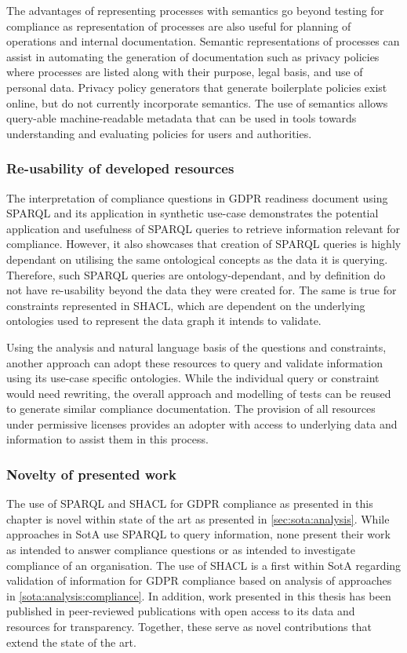 The advantages of representing processes with semantics go beyond testing for compliance as representation of processes are also useful for planning of operations and internal documentation. Semantic representations of processes can assist in automating the generation of documentation such as privacy policies where processes are listed along with their purpose, legal basis, and use of personal data. Privacy policy generators that generate boilerplate policies exist online, but do not currently incorporate semantics. The use of semantics allows query-able machine-readable metadata that can be used in tools towards understanding and evaluating policies for users and authorities.

\subsubsection*{Re-usability of developed resources}
The interpretation of compliance questions in GDPR readiness document using SPARQL and its application in synthetic use-case demonstrates the potential application and usefulness of SPARQL queries to retrieve information relevant for compliance.
However, it also showcases that creation of SPARQL queries is highly dependant on utilising the same ontological concepts as the data it is querying. Therefore, such SPARQL queries are ontology-dependant, and by definition do not have re-usability beyond the data they were created for.
The same is true for constraints represented in SHACL, which are dependent on the underlying ontologies used to represent the data graph it intends to validate.

Using the analysis and natural language basis of the questions and constraints, another approach can adopt these resources to query and validate information using its use-case specific ontologies.
While the individual query or constraint would need rewriting, the overall approach and modelling of tests can be reused to generate similar compliance documentation.
The provision of all resources under permissive licenses provides an adopter with access to underlying data and information to assist them in this process.

\subsubsection*{Novelty of presented work}
The use of SPARQL and SHACL for GDPR compliance as presented in this chapter is novel within state of the art as presented in \autoref{sec:sota:analysis}.
While approaches in SotA use SPARQL to query information, none present their work as intended to answer compliance questions or as intended to investigate compliance of an organisation.
The use of SHACL is a first within SotA regarding validation of information for GDPR compliance based on analysis of approaches in \autoref{sota:analysis:compliance}.
In addition, work presented in this thesis has been published in peer-reviewed publications with open access to its data and resources for transparency.
Together, these serve as novel contributions that extend the state of the art.

